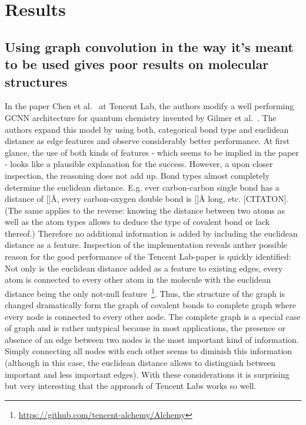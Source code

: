 \chapter{Results}
\label{chapter:Results}



\section{Using graph convolution in the way it's meant to be used gives poor results on molecular structures}

In the paper Chen et al.~\cite{Chen2019} at Tencent Lab, the authors modify a well performing GCNN architecture for quantum chemistry invented by Gilmer et al.~\cite{bibid}. The authors expand this model by using both, categorical bond type and euclidean distance as edge features and observe considerably better performance. At first glance, the use of both kinds of features - which seems to be implied in the paper - looks like a plausible explanation for the success. However, a upon closer inspection, the reasoning does not add up. Bond types almost completely determine the euclidean distance. E.g. ever carbon-carbon single bond has a distance of []Å, every carbon-oxygen double bond is []Å long, etc. [CITATON]. (The same applies to the reverse: knowing the distance between two atoms as well as the atom types allows to deduce the type of covalent bond or lack thereof.) Therefore no additional information is added by including the euclidean distance as a feature. Inspection of the implementation reveals anther possible reason for the good performance of the Tencent Lab-paper is quickly identified: Not only is the euclidean distance added as a feature to existing edges, every atom is connected to every other atom in the molecule with the euclidean distance being the only not-null feature~\footnote{\url{https://github.com/tencent-alchemy/Alchemy}}. Thus, the structure of the graph is changed dramatically form the graph of covalent bonds to complete graph where every node is connected to every other node. The complete graph is a special case of graph and is rather untypical because in most applications, the presence or absence of an edge between two nodes is the most important kind of information. Simply connecting all nodes with each other seems to diminish this information (although in this case, the euclidean distance allows to distinguish between important and less important edges). With these considerations it is surprising but very interesting that the approach of Tencent Labs works so well.

